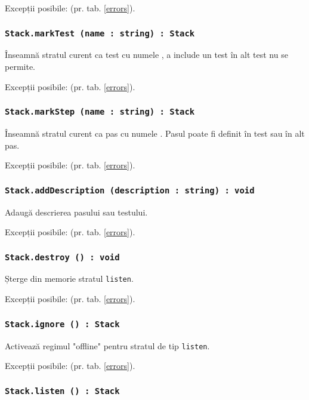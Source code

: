 Excepții posibile:  (pr. tab. \ref{errors}).

\subsubsection{\lstinline|Stack.markTest (name : string) : Stack|}

Înseamnă stratul curent ca test cu numele , a include un test în alt test nu se permite.

Excepții posibile:  (pr. tab. \ref{errors}).

\subsubsection{\lstinline|Stack.markStep (name : string) : Stack|}

Înseamnă stratul curent ca pas cu numele . Pasul poate fi definit în test sau în alt pas.

Excepții posibile:  (pr. tab. \ref{errors}).

\subsubsection{\lstinline|Stack.addDescription (description : string) : void|}

Adaugă descrierea pasului sau testului.

Excepții posibile:  (pr. tab. \ref{errors}).

\subsubsection{\lstinline|Stack.destroy () : void|}

Șterge din memorie stratul \lstinline|listen|.

Excepții posibile:  (pr. tab. \ref{errors}).

\subsubsection{\lstinline|Stack.ignore () : Stack|}

Activează regimul "offline" pentru stratul de tip \lstinline|listen|.

Excepții posibile:  (pr. tab. \ref{errors}).

\subsubsection{\lstinline|Stack.listen () : Stack|}

